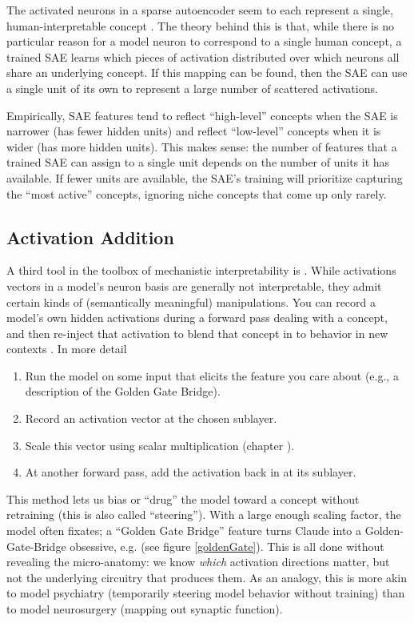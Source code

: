 The activated neurons in a sparse autoencoder seem to each represent a single,
human-interpretable concept \cite{cunningham2023sparse,
bricken2023monosemanticity}. The theory behind this is that, while there is no
particular reason for a model neuron to correspond to a single human concept, a
trained SAE learns which pieces of activation distributed over which neurons
all share an underlying concept. If this mapping can be found, then the SAE can
use a single unit of its own to represent a large number of scattered
activations.

Empirically, SAE features tend to reflect ``high-level'' concepts when the SAE
is narrower (has fewer hidden units) and reflect ``low-level'' concepts when it
is wider (has more hidden units). This makes sense: the number of features that
a trained SAE can assign to a single unit depends on the number of units it has
available. If fewer units are available, the SAE's training will prioritize
capturing the ``most active'' concepts, ignoring niche concepts that come up
only rarely.

\subsection{Activation Addition}

A third tool in the toolbox of mechanistic interpretability is
. While activations vectors in a model's neuron
basis are generally not interpretable, they admit certain kinds of
(semantically meaningful) manipulations. You can record a model's own hidden
activations during a forward pass dealing with a concept, and then re-inject
that activation to blend that concept in to behavior in new contexts
\cite{turner2024activation,zou2025representation}. In more detail

\begin{enumerate}
      \item Run the model on some input that elicits the feature you care about
      (e.g., a description of the Golden Gate Bridge).
      \item Record an activation vector at the chosen sublayer.
      \item Scale this vector using scalar multiplication (chapter
      ).
      \item At another forward pass, add the activation back in at its
      sublayer.
 \end{enumerate}
 
 This method lets us bias or “drug” the model toward a concept without
 retraining (this is also called ``steering''). With a large enough scaling
 factor, the model often fixates; a ``Golden Gate Bridge'' feature turns Claude
 into a Golden-Gate-Bridge obsessive, e.g. (see figure \ref{goldenGate}). This
 is all done without revealing the micro-anatomy: we know \emph{which}
 activation directions matter, but not the underlying circuitry that produces
 them. As an analogy, this is more akin to model psychiatry (temporarily
 steering model behavior without training) than to model neurosurgery (mapping
 out synaptic function).
 
